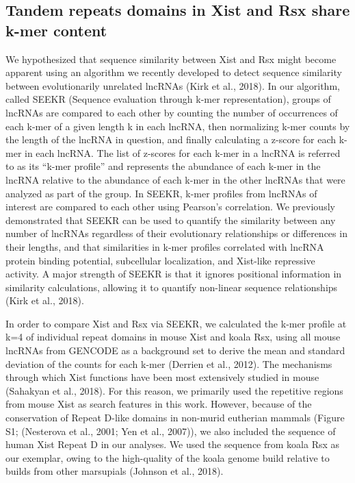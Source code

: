 \subsection{Tandem repeats domains in Xist and Rsx share k-mer content}
We hypothesized that sequence similarity between Xist and Rsx might become apparent using an algorithm we recently developed to detect sequence similarity between evolutionarily unrelated lncRNAs (Kirk et al., 2018). In our algorithm, called SEEKR (Sequence evaluation through k-mer representation), groups of lncRNAs are compared to each other by counting the number of occurrences of each k-mer of a given length k in each lncRNA, then normalizing k-mer counts by the length of the lncRNA in question, and finally calculating a z-score for each k-mer in each lncRNA. The list of z-scores for each k-mer in a lncRNA is referred to as its “k-mer profile” and represents the abundance of each k-mer in the lncRNA relative to the abundance of each k-mer in the other lncRNAs that were analyzed as part of the group. In SEEKR, k-mer profiles from lncRNAs of interest are compared to each other using Pearson’s correlation. We previously demonstrated that SEEKR can be used to quantify the similarity between any number of lncRNAs regardless of their evolutionary relationships or differences in their lengths, and that similarities in k-mer profiles correlated with lncRNA protein binding potential, subcellular localization, and Xist-like repressive activity. A major strength of SEEKR is that it ignores positional information in similarity calculations, allowing it to quantify non-linear sequence relationships (Kirk et al., 2018). 

In order to compare Xist and Rsx via SEEKR, we calculated the k-mer profile at k=4 of individual repeat domains in mouse Xist and koala Rsx, using all mouse lncRNAs from GENCODE as a background set to derive the mean and standard deviation of the counts for each k-mer (Derrien et al., 2012). The mechanisms through which Xist functions have been most extensively studied in mouse (Sahakyan et al., 2018). For this reason, we primarily used the repetitive regions from mouse Xist as search features in this work. However, because of the conservation of Repeat D-like domains in non-murid eutherian mammals (Figure S1; (Nesterova et al., 2001; Yen et al., 2007)), we also included the sequence of human Xist Repeat D in our analyses. We used the sequence from koala Rsx as our exemplar, owing to the high-quality of the koala genome build relative to builds from other marsupials (Johnson et al., 2018).

